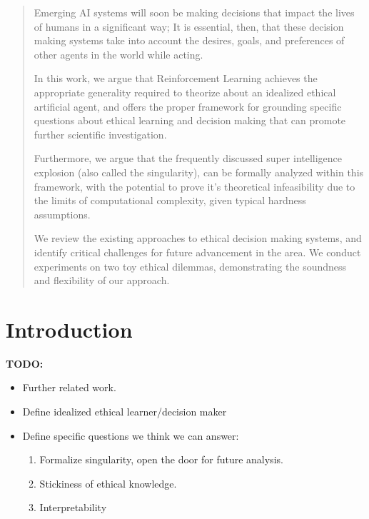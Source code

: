 \documentclass[11pt]{article}
\begin{document}
\begin{abstract}
Emerging AI systems will soon be making decisions that impact the lives of humans in a significant way; It is essential, then, that these decision making systems take into account the desires, goals, and preferences of other agents in the world while acting.

In this work, we argue that Reinforcement Learning achieves the appropriate generality required to theorize about an idealized ethical artificial agent, and offers the proper framework for grounding specific questions about ethical learning and decision making that can promote further scientific investigation.


Furthermore, we argue that the frequently discussed super intelligence explosion (also called the singularity), can be formally analyzed within this framework, with the potential to prove it's theoretical infeasibility due to the limits of computational complexity, given typical hardness assumptions.


We review the existing approaches to ethical decision making systems, and identify critical challenges for future advancement in the area. We conduct experiments on two toy ethical dilemmas, demonstrating the soundness and flexibility of our approach.

\end{abstract}

\section{Introduction}

{\bf TODO:}
\begin{itemize}
\item Further related work.
\item Define idealized ethical learner/decision maker
\item Define specific questions we think we can answer:
\begin{enumerate}
\item Formalize singularity, open the door for future analysis.
\item Stickiness of ethical knowledge.
\item Interpretability
\end{enumerate}
\end{itemize}
\end{document}
